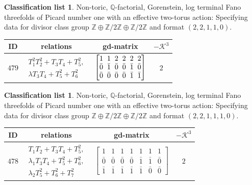 \documentclass[pdftex]{sigma}%
\theoremstyle{definition}
\newtheorem{class-list}[thm]{Classification list}
\def\ZZ{{\mathbb Z}}
\def\QQ{{\mathbb Q}}
\numberwithin{equation}{section}
\begin{document}
\begin{class-list}
Non-toric, $\QQ$-factorial, Gorenstein, log terminal Fano
threefolds of Picard number one with an effective two-torus action:
Specifying data for divisor class group
$\ZZ\oplus \ZZ/2\ZZ\oplus \ZZ/2\ZZ$ and format $(2,2,1,1,0)$.
\begin{table}[h!]\centering\setlength{\tabcolsep}{5.5pt}
\renewcommand{\arraystretch}{1.15}\small\tabulinesep=1mm
\begin{tabu}{c|c|c|c}
\hline
ID&relations&gd-matrix&$-\mathcal{K}^3$
\\
\hline
${479}$&$\begin{array}{r}{T_{1}^{2}T_{2}^{2}+T_{3}T_{4}+T_{5}^{2}},\\ {\lambda T_{3}T_{4}+T_{5}^{2}+T_{6}^{2}}\end{array}$
&
$\arraycolsep=1mm\begin{bmatrix}{1} & {1} & {2} & {2} & {2} & {2} \\ {\bar{0}} & {\bar{1}} & {\bar{0}} & {\bar{0}} & {\bar{1}} & {\bar{0}} \\ {\bar{0}} & {\bar{0}} & {\bar{0}} & {\bar{0}} & {\bar{1}} & {\bar{1}}\end{bmatrix}$&${2}$
\\
\hline
\end{tabu}\vspace{-4mm}
\end{table}
\end{class-list}



\begin{class-list}
Non-toric, $\QQ$-factorial, Gorenstein, log terminal Fano
threefolds of Picard number one with an effective two-torus action:
Specifying data for divisor class group
$\ZZ\oplus \ZZ/2\ZZ\oplus \ZZ/2\ZZ$ and format $(2,2,1,1,1,0)$.
\begin{table}[h!]\centering\setlength{\tabcolsep}{5.5pt}
\renewcommand{\arraystretch}{1.25}\small\tabulinesep=1mm
\begin{tabu}{c|c|c|c}
\hline
ID&relations&gd-matrix&$-\mathcal{K}^3$
\\
\hline
${478}$&
$\begin{array}{r}{T_{1}T_{2}+T_{3}T_{4}+T_{5}^{2}},\\ {\lambda_{1} T_{3}T_{4}+T_{5}^{2}+T_{6}^{2}},\\ {\lambda_{2} T_{5}^{2}+T_{6}^{2}+T_{7}^{2}}\end{array}$
&$\begin{bmatrix}{1} & {1} & {1} & {1} & {1} & {1} & {1} \\ {\bar{0}} & {\bar{0}} & {\bar{0}} & {\bar{0}} & {\bar{1}} & {\bar{1}} & {\bar{0}} \\ {\bar{1}} & {\bar{1}} & {\bar{1}} & {\bar{1}} & {\bar{1}} & {\bar{0}} & {\bar{0}}\end{bmatrix}$&${2}$
\\
\hline
\end{tabu}%
\end{table}
\end{class-list}
\end{document}

